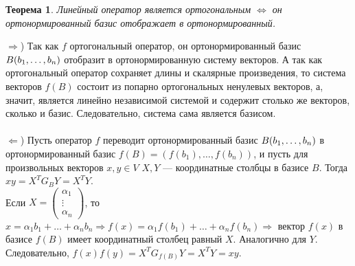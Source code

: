 \newtheorem*{th14_5_1}{Теорема}\begin{th14_5_1}Линейный оператор является ортогональным $\Longleftrightarrow$ он ортонормированный базис отображает в ортонормированный.
\end{th14_5_1}
\begin{Proof}
	$\Rightarrow$) Так как $f$ ортогональный оператор, он ортонормированный базис $B(b_1,\dots,b_n)$ отобразит в ортонормированную систему векторов. А так как ортогональный оператор сохраняет длины и скалярные произведения, то система векторов $f(B)$ состоит из попарно ортогональных ненулевых векторов, а, значит, является линейно независимой системой и содержит столько же векторов, сколько и базис. Следовательно, система сама является базисом.\\\\
	$\Leftarrow$) Пусть оператор $f$ переводит ортонормированный базис $B(b_1,\dots,b_n)$ в ортонормированный базис $f(B) = (f(b_1), \dots, f(b_n))$, и пусть для произвольных векторов $x,y \in V$ $X,Y$ --- координатные столбцы в базисе $B$. Тогда $xy = X^TG_BY = X^TY$.\\ Если $X = \begin{pmatrix}\alpha_1\\ \vdots \\ \alpha_n\end{pmatrix}$, то $x = \alpha_1b_1+ \ldots + \alpha_nb_n \Rightarrow f(x)= \alpha_1f(b_1)+ \ldots + \alpha_nf(b_n) \Rightarrow $ вектор $f(x)$ в базисе $f(B)$ имеет координатный столбец равный $X$. Аналогично для $Y$. Следовательно, $f(x)f(y) = X^TG_{f(B)}Y = X^TY = xy $.
\end{Proof}
